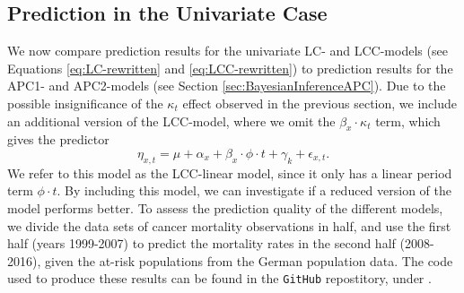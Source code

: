 
\subsection{Prediction in the Univariate Case}
\label{sec:uv-pred}
We now compare prediction results for the univariate LC- and LCC-models (see Equations \ref{eq:LC-rewritten} and \ref{eq:LCC-rewritten}) to prediction results for the APC1- and APC2-models (see Section \ref{sec:BayesianInferenceAPC}). Due to the possible insignificance of the $\kappa_t$ effect observed in the previous section, we include an additional version of the LCC-model, where we omit the $\beta_x\cdot \kappa_t$ term, which gives the predictor
\begin{equation}
    \eta_{x,t} = \mu + \alpha_x + \beta_x\cdot \phi \cdot t + \gamma_k + \epsilon_{x,t}.
\end{equation}
We refer to this model as the LCC-linear model, since it only has a linear period term $\phi \cdot t$. By including this model, we can investigate if a reduced version of the model performs better. To assess the prediction quality of the different models, we divide the data sets of cancer mortality observations in half, and use the first half (years 1999-2007) to predict the mortality rates in the second half (2008-2016), given the at-risk populations from the German population data. The code used to produce these results can be found in the \texttt{GitHub} repostitory, under . 

